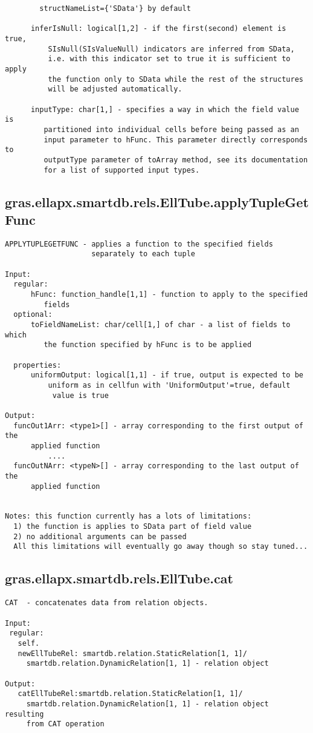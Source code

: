 \begin{verbatim}
        structNameList={'SData'} by default

      inferIsNull: logical[1,2] - if the first(second) element is true,
          SIsNull(SIsValueNull) indicators are inferred from SData,
          i.e. with this indicator set to true it is sufficient to apply
          the function only to SData while the rest of the structures
          will be adjusted automatically.

      inputType: char[1,] - specifies a way in which the field value is
         partitioned into individual cells before being passed as an
         input parameter to hFunc. This parameter directly corresponds to
         outputType parameter of toArray method, see its documentation
         for a list of supported input types.
\end{verbatim}
\subsection{\texorpdfstring{gras.ellapx.smartdb.rels.EllTube.applyTupleGetFunc}{applyTupleGetFunc}}\label{method:gras.ellapx.smartdb.rels.EllTube.applyTupleGetFunc}
\begin{verbatim}
APPLYTUPLEGETFUNC - applies a function to the specified fields
                    separately to each tuple

Input:
  regular:
      hFunc: function_handle[1,1] - function to apply to the specified
         fields
  optional:
      toFieldNameList: char/cell[1,] of char - a list of fields to which
         the function specified by hFunc is to be applied

  properties:
      uniformOutput: logical[1,1] - if true, output is expected to be
          uniform as in cellfun with 'UniformOutput'=true, default
           value is true

Output:
  funcOut1Arr: <type1>[] - array corresponding to the first output of the
      applied function
          ....
  funcOutNArr: <typeN>[] - array corresponding to the last output of the
      applied function


Notes: this function currently has a lots of limitations:
  1) the function is applies to SData part of field value
  2) no additional arguments can be passed
  All this limitations will eventually go away though so stay tuned...
\end{verbatim}
\subsection{\texorpdfstring{gras.ellapx.smartdb.rels.EllTube.cat}{cat}}\label{method:gras.ellapx.smartdb.rels.EllTube.cat}
\begin{verbatim}
CAT  - concatenates data from relation objects.

Input:
 regular:
   self.
   newEllTubeRel: smartdb.relation.StaticRelation[1, 1]/
     smartdb.relation.DynamicRelation[1, 1] - relation object

Output:
   catEllTubeRel:smartdb.relation.StaticRelation[1, 1]/
     smartdb.relation.DynamicRelation[1, 1] - relation object resulting
     from CAT operation
\end{verbatim}
